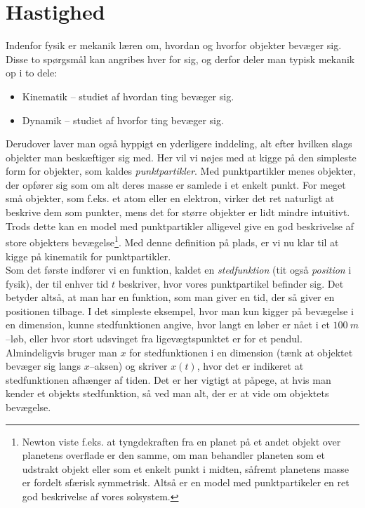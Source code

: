 \section{Hastighed} \label{mat:sec:vel}
Indenfor fysik er mekanik læren om, hvordan og hvorfor objekter bevæger sig. Disse to spørgsmål kan angribes hver for sig, og derfor deler man typisk mekanik op i to dele:
\begin{itemize}
\item Kinematik -- studiet af hvordan ting bevæger sig.
\item Dynamik -- studiet af hvorfor ting bevæger sig.
\end{itemize}
Derudover laver man også hyppigt en yderligere inddeling, alt efter hvilken slags objekter man beskæftiger sig med. Her vil vi nøjes med at kigge på den simpleste form for objekter, som kaldes \emph{punktpartikler}. Med punktpartikler menes objekter, der opfører sig som om alt deres masse er samlede i et enkelt punkt. For meget små objekter, som f.eks. et atom eller en elektron, virker det ret naturligt at beskrive dem som punkter, mens det for større objekter er lidt mindre intuitivt. Trods dette kan en model med punktpartikler alligevel give en god beskrivelse af store objekters bevægelse\footnote{Newton viste f.eks. at tyngdekraften fra en planet på et andet objekt over planetens overflade er den samme, om man behandler planeten som et udstrakt objekt eller som et enkelt punkt i midten, såfremt planetens masse er fordelt sfærisk symmetrisk. Altså er en model med punktpartikeler en ret god beskrivelse af vores solsystem.}. Med denne definition på plads, er vi nu klar til at kigge på kinematik for punktpartikler. \\


Som det første indfører vi en funktion, kaldet en \emph{stedfunktion} (tit også \emph{position} i fysik), der til enhver tid $t$ beskriver, hvor vores punktpartikel befinder sig. Det betyder altså, at man har en funktion, som man giver en tid, der så giver en positionen tilbage. I det simpleste eksempel, hvor man kun kigger på bevægelse i en dimension, kunne stedfunktionen angive, hvor langt en løber er nået i et $\SI{100}{m}$--løb, eller hvor stort udsvinget fra ligevægtspunktet er for et pendul. Almindeligvis bruger man $x$ for stedfunktionen i en dimension (tænk at objektet bevæger sig langs $x$--aksen) og skriver $x(t)$, hvor det er indikeret at stedfunktionen afhænger af tiden. Det er her vigtigt at påpege, at hvis man kender et objekts stedfunktion, så ved man alt, der er at vide om objektets bevægelse.

